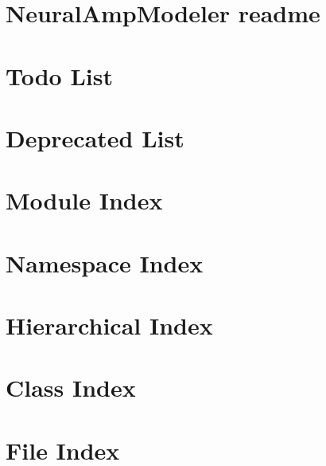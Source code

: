 \let\mypdfximage\pdfximage\def\pdfximage{\immediate\mypdfximage}\documentclass[twoside]{book}
\newcommand{\+}{\discretionary{\mbox{\scriptsize$\hookleftarrow$}}{}{}}
\begin{document}
\chapter{Neural\+Amp\+Modeler readme}
\label{md__c_1__users_fab_src__github_branches__neural_amp_modeler_plugin__neural_amp_modeler__r_e_a_d_m_e}

\chapter{Todo List}
\label{todo}

\chapter{Deprecated List}
\label{deprecated}

\chapter{Module Index}

\chapter{Namespace Index}

\chapter{Hierarchical Index}

\chapter{Class Index}

\chapter{File Index}

\end{document}

